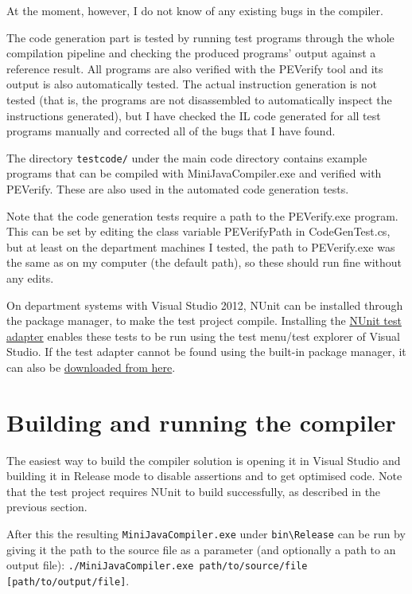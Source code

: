 \documentclass[a4paper,11pt]{article}
\begin{document}
At the moment, however, I do not know of any existing bugs in the compiler.

The code generation part is tested by running test programs through the whole compilation pipeline and checking the produced programs' output against a reference result. All programs are also verified with the PEVerify tool and its output is also automatically tested. The actual instruction generation is not tested (that is, the programs are not disassembled to automatically inspect the instructions generated), but I have checked the IL code generated for all test programs manually and corrected all of the bugs that I have found.

The directory \verb,testcode/, under the main code directory contains example programs that can be compiled with MiniJavaCompiler.exe and verified with PEVerify. These are also used in the automated code generation tests.

Note that the code generation tests require a path to the PEVerify.exe program. This can be set by editing the class variable PEVerifyPath in CodeGenTest.cs, but at least on the department machines I tested, the path to PEVerify.exe was the same as on my computer (the default path), so these should run fine without any edits.

On department systems with Visual Studio 2012, NUnit can be installed through the package manager, to make the test project compile. Installing the \href{http://nunit.org/index.php?p=vsTestAdapter&r=2.6.1}{NUnit test adapter} enables these tests to be run using the test menu/test explorer of Visual Studio. If the test adapter cannot be found using the built-in package manager, it can also be \href{http://visualstudiogallery.msdn.microsoft.com/6ab922d0-21c0-4f06-ab5f-4ecd1fe7175d}{downloaded from here}.

\section{Building and running the compiler}

The easiest way to build the compiler solution is opening it in Visual Studio and building it in Release mode to disable assertions and to get optimised code. Note that the test project requires NUnit to build successfully, as described in the previous section.

After this the resulting \verb,MiniJavaCompiler.exe, under \verb,bin\Release, can be run by giving it the path to the source file as a parameter (and optionally a path to an output file): \verb,./MiniJavaCompiler.exe path/to/source/file [path/to/output/file],.
\end{document}
